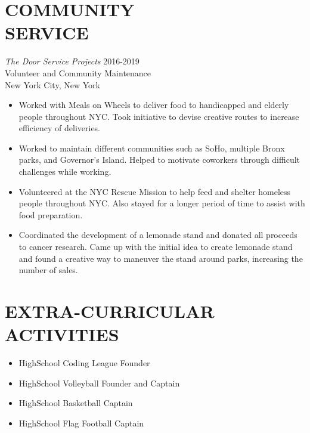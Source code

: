 \documentclass[margin]{res}
\begin{document}
\begin{resume}
\section{COMMUNITY \\ SERVICE}  {\sl The Door Service Projects} \hfill 2016-2019 \\
				Volunteer and Community Maintenance \\ New York City, New York
				\begin{itemize} \itemsep -2pt
						\item Worked with Meals on Wheels to deliver food to 
								handicapped and elderly people throughout
								NYC. Took initiative to devise creative routes 
								to increase efficiency of deliveries.
						\item Worked to maintain different communities such as SoHo, 
								multiple Bronx parks, and Governor’s
								Island. Helped to motivate coworkers through difficult 
								challenges while working.
						\item Volunteered at the NYC Rescue Mission to help feed and 
								shelter homeless people throughout
								NYC. Also stayed for a longer period of time to 
								assist with food preparation. 
						\item Coordinated the development of a lemonade stand and 
								donated all proceeds to cancer
								research. Came up with the initial idea to 
								create lemonade stand and found a creative way to
								maneuver the stand around parks, increasing the number of sales.
				\end{itemize}

				
\section{EXTRA-CURRICULAR \\ ACTIVITIES}  
			\begin{itemize}
						\item HighSchool Coding League Founder 
						\item HighSchool Volleyball Founder and Captain 
						\item HighSchool Basketball Captain
						\item HighSchool Flag Football Captain
			\end{itemize}

\end{resume}
\end{document}
